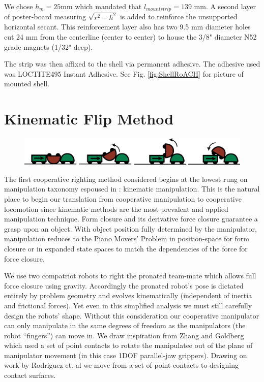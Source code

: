\documentclass[letterpaper]{report}
\begin{document}
We chose $h_m = 25$mm which mandated that $l_{mountstrip} = 139$ mm.
A second layer of poster-board measuring $\sqrt{r^2-h^2}$ is added to reinforce the unsupported horizontal secant.
This reinforcement layer also has two 9.5 mm diameter holes cut 24 mm from the centerline (center to center) to house the 3/8" diameter N52 grade magnets (1/32" deep).

The strip was then affixed to the shell via permanent adhesive. The adhesive used was LOCTITE495 Instant Adhesive.
See Fig. \ref{fig:ShellRoACH} for picture of mounted shell.

\chapter{Kinematic Flip Method}
\begin{figure}[ht]
\centering
\includegraphics[width=1.0\textwidth]{Kinematic_CoopCartoon.png}
\end{figure}

The first cooperative righting method considered begins at the lowest rung on manipulation taxonomy espoused in \cite{MasonMORMBook}: kinematic manipulation.
This is the natural place to begin our translation from cooperative manipulation to cooperative locomotion since kinematic methods are the most prevalent and applied manipulation technique.
Form closure and its derivative force closure guarantee a grasp upon an object.
With object position fully determined by the manipulator, manipulation reduces to the Piano Movers' Problem in position-space for form closure or in expanded state spaces to match the dependencies of the force for force closure.

We use two compatriot robots to right the pronated team-mate which allows full force closure using gravity.
Accordingly the pronated robot's pose is dictated entirely by problem geometry and evolves kinematically (independent of inertia and frictional forces).
Yet even in this simplified analysis we must still carefully design the robots' shape. Without this consideration our cooperative manipulator can only manipulate in the same degrees of freedom as the manipulators (the robot ``fingers'') can move in.
We draw inspiration from Zhang and Goldberg \cite{zhang2002gripper} which used a set of point contacts to rotate the manipulatee out of the plane of manipulator movement (in this case 1DOF parallel-jaw grippers).
Drawing on work by Rodriguez et. al \cite{rodriguez2013effector} we move from a set of point contacts to designing contact surfaces.
\end{document}
